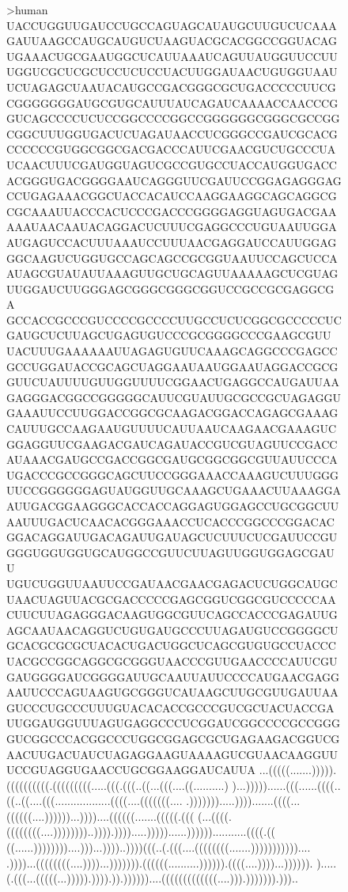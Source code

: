 \begin{figure}[H]
  \begin{code}[fontsize=\scriptsize, frame=none, samepage=true]
>human
UACCUGGUUGAUCCUGCCAGUAGCAUAUGCUUGUCUCAAAGAUUAAGCCAUGCAUGUCUAAGUACGCACGGCCGGUACAG
UGAAACUGCGAAUGGCUCAUUAAAUCAGUUAUGGUUCCUUUGGUCGCUCGCUCCUCUCCUACUUGGAUAACUGUGGUAAU
UCUAGAGCUAAUACAUGCCGACGGGCGCUGACCCCCUUCGCGGGGGGGAUGCGUGCAUUUAUCAGAUCAAAACCAACCCG
GUCAGCCCCUCUCCGGCCCCGGCCGGGGGGCGGGCGCCGGCGGCUUUGGUGACUCUAGAUAACCUCGGGCCGAUCGCACG
CCCCCCGUGGCGGCGACGACCCAUUCGAACGUCUGCCCUAUCAACUUUCGAUGGUAGUCGCCGUGCCUACCAUGGUGACC
ACGGGUGACGGGGAAUCAGGGUUCGAUUCCGGAGAGGGAGCCUGAGAAACGGCUACCACAUCCAAGGAAGGCAGCAGGCG
CGCAAAUUACCCACUCCCGACCCGGGGAGGUAGUGACGAAAAAUAACAAUACAGGACUCUUUCGAGGCCCUGUAAUUGGA
AUGAGUCCACUUUAAAUCCUUUAACGAGGAUCCAUUGGAGGGCAAGUCUGGUGCCAGCAGCCGCGGUAAUUCCAGCUCCA
AUAGCGUAUAUUAAAGUUGCUGCAGUUAAAAAGCUCGUAGUUGGAUCUUGGGAGCGGGCGGGCGGUCCGCCGCGAGGCGA
GCCACCGCCCGUCCCCGCCCCUUGCCUCUCGGCGCCCCCUCGAUGCUCUUAGCUGAGUGUCCCGCGGGGCCCGAAGCGUU
UACUUUGAAAAAAUUAGAGUGUUCAAAGCAGGCCCGAGCCGCCUGGAUACCGCAGCUAGGAAUAAUGGAAUAGGACCGCG
GUUCUAUUUUGUUGGUUUUCGGAACUGAGGCCAUGAUUAAGAGGGACGGCCGGGGGCAUUCGUAUUGCGCCGCUAGAGGU
GAAAUUCCUUGGACCGGCGCAAGACGGACCAGAGCGAAAGCAUUUGCCAAGAAUGUUUUCAUUAAUCAAGAACGAAAGUC
GGAGGUUCGAAGACGAUCAGAUACCGUCGUAGUUCCGACCAUAAACGAUGCCGACCGGCGAUGCGGCGGCGUUAUUCCCA
UGACCCGCCGGGCAGCUUCCGGGAAACCAAAGUCUUUGGGUUCCGGGGGGAGUAUGGUUGCAAAGCUGAAACUUAAAGGA
AUUGACGGAAGGGCACCACCAGGAGUGGAGCCUGCGGCUUAAUUUGACUCAACACGGGAAACCUCACCCGGCCCGGACAC
GGACAGGAUUGACAGAUUGAUAGCUCUUUCUCGAUUCCGUGGGUGGUGGUGCAUGGCCGUUCUUAGUUGGUGGAGCGAUU
UGUCUGGUUAAUUCCGAUAACGAACGAGACUCUGGCAUGCUAACUAGUUACGCGACCCCCGAGCGGUCGGCGUCCCCCAA
CUUCUUAGAGGGACAAGUGGCGUUCAGCCACCCGAGAUUGAGCAAUAACAGGUCUGUGAUGCCCUUAGAUGUCCGGGGCU
GCACGCGCGCUACACUGACUGGCUCAGCGUGUGCCUACCCUACGCCGGCAGGCGCGGGUAACCCGUUGAACCCCAUUCGU
GAUGGGGAUCGGGGAUUGCAAUUAUUCCCCAUGAACGAGGAAUUCCCAGUAAGUGCGGGUCAUAAGCUUGCGUUGAUUAA
GUCCCUGCCCUUUGUACACACCGCCCGUCGCUACUACCGAUUGGAUGGUUUAGUGAGGCCCUCGGAUCGGCCCCGCCGGG
GUCGGCCCACGGCCCUGGCGGAGCGCUGAGAAGACGGUCGAACUUGACUAUCUAGAGGAAGUAAAAGUCGUAACAAGGUU
UCCGUAGGUGAACCUGCGGAAGGAUCAUUA
...(((((.......))))).((((((((((.(((((((((.....(((.(((..((...(((....((..........)
)...)))))......(((......((((..((..((....(((..................((((....(((((((....
.))))))).....)))).......((((...((((((....))))))...))))....((((((.......(((((.(((
(...((((.((((((((....))))))))..)))).)))).....)))))......))))))...........((((.((
((......))))))))....)))...))))..))))(((..(.(((....((((((((.......)))))))))))....
.))))...((((((((....))))...))))))).((((((..........)))))).((((....))))...)))))).
).....(.(((...(((((...))))).)))).)).))))))....(((((((((((((....))).))))))).)))..

\end{code}
\end{figure}
